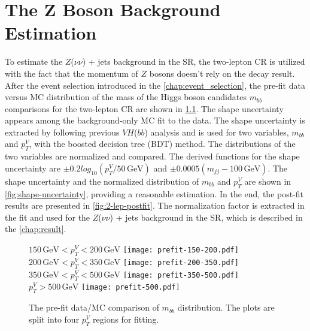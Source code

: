 \documentclass[class=NTHU_thesis, crop=false]{standalone}
\begin{document}
\chapter{The Z Boson Background Estimation}
\label{chap:Z_bkg_estimation}
To estimate the $Z$($\nu\nu$) + jets background in the SR, the two-lepton CR is utilized with the fact that the momentum of $Z$ bosons doesn't rely on the decay result. After the event selection introduced in the \autoref{chap:event_selection}, the pre-fit data versus MC distribution of the mass of the Higgs boson candidates $m_{bb}$ comparisons for the two-lepton CR are shown in \cref{fig:2-lep-prefit}. The shape uncertainty appears among the background-only MC fit to the data. The shape uncertainty is extracted by following previous $VH$($bb$) analysis\cite{Robson:2235887} and is used for two variables, $m_{bb}$ and $p^V_T$, with the boosted decision tree (BDT) method\cite{pmid28114007}. The distributions of the two variables are normalized and compared. The derived functions for the shape uncertainty are $\pm 0.2 log_{10} (p^V_T/50\, \mathrm{GeV})$ and $\pm 0.0005 (m_{jj} - 100\, \mathrm{GeV})$. The shape uncertainty and the normalized distribution of $m_{bb}$ and $p^V_T$ are shown in \cref{fig:shape-uncertainty}, providing a reasonable estimation. In the end, the post-fit results are presented in \cref{fig:2-lep-postfit}. The normalization factor is extracted in the fit and used for the $Z$($\nu\nu$) + jets background in the SR, which is described in the \autoref{chap:result}.

\begin{figure}[!hbt]
	\captionsetup[subfigure]{labelformat=empty}
	\centering
	\subcaptionbox
		{$150\, \mathrm{GeV} < p^V_T < 200\, \mathrm{GeV}$
		\label{fig:2-lep-prefit-fig1}}
		{\texttt{[image: prefit-150-200.pdf]}}
	\subcaptionbox
		{$200\, \mathrm{GeV} < p^V_T < 350\, \mathrm{GeV}$
		\label{fig:2-lep-prefit-fig2}}
		{\texttt{[image: prefit-200-350.pdf]}}
	\vspace{\baselineskip}
	\subcaptionbox
		{$350\, \mathrm{GeV} < p^V_T < 500\, \mathrm{GeV}$
		\label{fig:2-lep-prefit-fig3}}
		{\texttt{[image: prefit-350-500.pdf]}}
	\subcaptionbox
		{$p^V_T > 500\, \mathrm{GeV}$
		\label{fig:2-lep-prefit-fig4}}
		{\texttt{[image: prefit-500.pdf]}}
	\caption{The pre-fit data/MC comparison of $m_{bb}$ distribution. The plots are split into four $p^V_T$ regions for fitting.}
	\label{fig:2-lep-prefit}
\end{figure}
\end{document}

